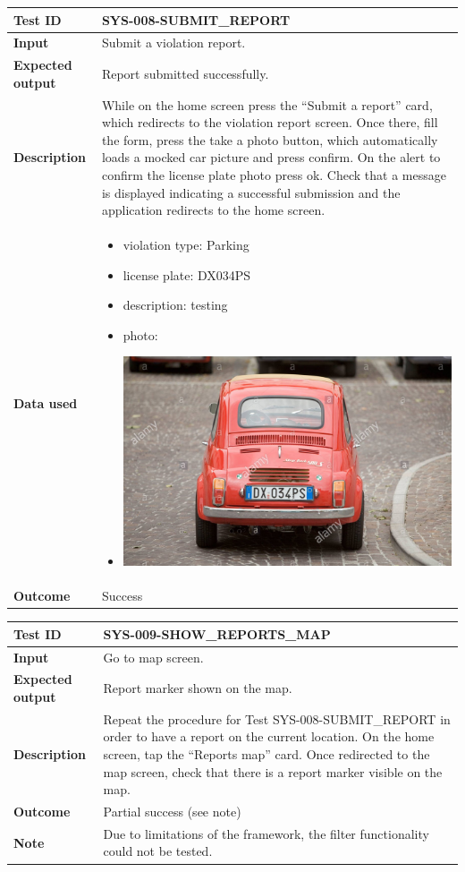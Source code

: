 \begin{table}[H]
    \centering
    \begin{tabular}{p{3cm}p{10cm}}
    \textbf{Test ID} & SYS-008-SUBMIT\_REPORT \\ \hline
    \textbf{Input} & Submit a violation report. \\ \hline
    \textbf{Expected output} & Report submitted successfully. \\ \hline
    \textbf{Description} & While on the home screen press the “Submit a report” card, which redirects to the violation report screen. Once there, fill the form, press the take a photo button, which automatically loads a mocked car picture and press confirm. On the alert to confirm the license plate photo press ok. Check that a message is displayed indicating a successful submission and the application redirects to the home screen. \\ \hline
    \textbf{Data used} & 
        \begin{itemize}[label={}] \itemsep0em
            \item violation type: Parking
            \item license plate: DX034PS
            \item description: testing
            \item photo: 
            \item \includegraphics[width=.3\textwidth]{Images/test-photo.jpg}
        \end{itemize} \\ \hline
    \textbf{Outcome} & Success \\ \hline
    \end{tabular}
\end{table}

\begin{table}[H]
    \centering
    \begin{tabular}{p{3cm}p{10cm}}
    \textbf{Test ID} & SYS-009-SHOW\_REPORTS\_MAP \\ \hline
    \textbf{Input} & Go to map screen. \\ \hline
    \textbf{Expected output} & Report marker shown on the map. \\ \hline
    \textbf{Description} & Repeat the procedure for Test SYS-008-SUBMIT\_REPORT in order to have a report on the current location. On the home screen, tap the “Reports map” card. Once redirected to the map screen, check that there is a report marker visible on the map. \\ \hline
    \textbf{Outcome} & Partial success (see note) \\ \hline
    \textbf{Note} & Due to limitations of the framework, the filter functionality could not be tested. \\ \hline
    \end{tabular}
\end{table}


